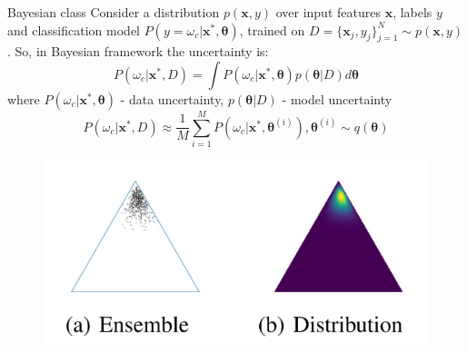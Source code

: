 \documentclass{beamer}
\begin{document}
\begin{frame}{Bayesian class}
     Consider a distribution $p(\mathbf{x}, y)$ over input features $\mathbf{x}$, labels $y$ and classification model $P(y = \omega_c | \mathbf{x}^*, \mathbf{\theta})$, trained on $D = \{\mathbf{x}_j, y_j\}_{j=1}^N \sim p(\mathbf{x}, y)$. So, in Bayesian framework the uncertainty is:
     $$P(\omega_c | \mathbf{x}^*, D) = \int P(\omega_c | \mathbf{x}^*, \mathbf{\theta})p(\mathbf{\theta}|D) d\mathbf{\theta}$$
     where $P(\omega_c | \mathbf{x}^*, \mathbf{\theta})$ - data uncertainty,
     $p(\mathbf{\theta}|D)$ - model uncertainty
     $$P(\omega_c | \mathbf{x}^*, D) \approx \frac{1}{M}\sum_{i=1}^MP(\omega_c | \mathbf{x}^*, \mathbf{\theta}^{(i)}), \mathbf{\theta}^{(i)} \sim q(\mathbf{\theta})$$
     \begin{figure}[h]
        \includegraphics[scale=0.25]{ensamble.jpg}
     \end{figure}
\end{frame}
\end{document}
